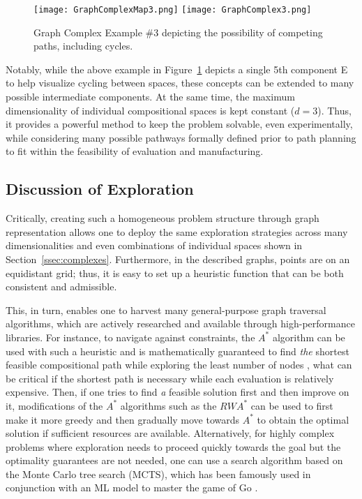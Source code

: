 \begin{figure}[h]
    \centering
    \texttt{[image: GraphComplexMap3.png]}
    \texttt{[image: GraphComplex3.png]}
    \caption{Graph Complex Example \#3 depicting the possibility of competing paths, including cycles.} 
    \label{fig:graphcomplex3}
\end{figure}

Notably, while the above example in Figure~\ref{fig:graphcomplex3} depicts a single 5th component E to help visualize cycling between spaces, these concepts can be extended to many possible intermediate components. At the same time, the maximum dimensionality of individual compositional spaces is kept constant ($d=3$). Thus, it provides a powerful method to keep the problem solvable, even experimentally, while considering many possible pathways formally defined prior to path planning to fit within the feasibility of evaluation and manufacturing.




\subsection{Discussion of Exploration} \label{sec:discussion}

Critically, creating such a homogeneous problem structure through graph representation allows one to deploy the same exploration strategies across many dimensionalities and even combinations of individual spaces shown in Section~\ref{ssec:complexes}. Furthermore, in the described graphs, points are on an equidistant grid; thus, it is easy to set up a heuristic function that can be both consistent and admissible. 

This, in turn, enables one to harvest many general-purpose graph traversal algorithms, which are actively researched and available through high-performance libraries. For instance, to navigate against constraints, the $A^*$ algorithm \cite{Hart1968APaths} can be used with such a heuristic and is mathematically guaranteed to find \textit{the} shortest feasible compositional path while exploring the least number of nodes \cite{Dechter1985GeneralizedA}, what can be critical if the shortest path is necessary while each evaluation is relatively expensive. Then, if one tries to find \emph{a} feasible solution first and then improve on it, modifications of the $A^*$ algorithms such as the $RWA^*$ \cite{Bhatia2021OnA} can be used to first make it more greedy and then gradually move towards $A^*$ to obtain the optimal solution if sufficient resources are available. Alternatively, for highly complex problems where exploration needs to proceed quickly towards the goal but the optimality guarantees are not needed, one can use a search algorithm based on the Monte Carlo tree search (MCTS), which has been famously used in conjunction with an ML model to master the game of Go \cite{Silver2016MasteringSearch}.



